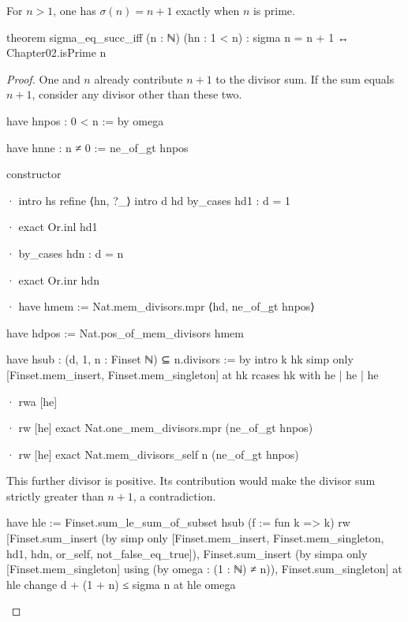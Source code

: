 \begin{theorem}
  \label{ent:thm:sigma-eq-succ-iff}
  For $n>1$, one has $\sigma(n)=n+1$ exactly when $n$ is prime.

  \begin{lean}
    theorem sigma_eq_succ_iff (n : ℕ) (hn : 1 < n) : sigma n = n + 1 ↔ Chapter02.isPrime n
  \end{lean}
\end{theorem}

\begin{proof}
  One and $n$ already contribute $n+1$ to the divisor sum.
  If the sum equals $n+1$, consider any divisor other than these two.

  \begin{lean}
    have hnpos : 0 < n := by
      omega

    have hnne : n ≠ 0 := ne_of_gt hnpos

    constructor

    · intro hs
      refine ⟨hn, ?_⟩
      intro d hd
      by_cases hd1 : d = 1

      · exact Or.inl hd1

      · by_cases hdn : d = n

        · exact Or.inr hdn

        · have hmem := Nat.mem_divisors.mpr ⟨hd, ne_of_gt hnpos⟩

          have hdpos := Nat.pos_of_mem_divisors hmem

          have hsub : ({d, 1, n} : Finset ℕ) ⊆ n.divisors := by
            intro k hk
            simp only [Finset.mem_insert, Finset.mem_singleton] at hk
            rcases hk with he | he | he

            · rwa [he]

            · rw [he]
              exact Nat.one_mem_divisors.mpr (ne_of_gt hnpos)

            · rw [he]
              exact Nat.mem_divisors_self n (ne_of_gt hnpos)
  \end{lean}

  This further divisor is positive.
  Its contribution would make the divisor sum strictly greater than $n+1$, a contradiction.

  \begin{lean}
    have hle := Finset.sum_le_sum_of_subset hsub (f := fun k => k)
    rw [Finset.sum_insert (by simp only [Finset.mem_insert, Finset.mem_singleton,
      hd1, hdn, or_self, not_false_eq_true]),
      Finset.sum_insert (by simpa only [Finset.mem_singleton] using
        (by omega : (1 : ℕ) ≠ n)), Finset.sum_singleton] at hle
    change d + (1 + n) ≤ sigma n at hle
    omega
  \end{lean}


\end{proof}
